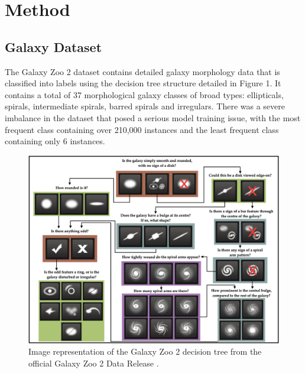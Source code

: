 \documentclass[10pt,twocolumn,letterpaper]{article}
\begin{document}
\section{Method}
\subsection{Galaxy Dataset}
The Galaxy Zoo 2 dataset contains detailed galaxy morphology data that is classified into labels using the decision tree structure detailed in Figure 1.
It contains a total of 37 morphological galaxy classes of broad types: ellipticals, spirals, intermediate spirals, barred spirals and irregulars.
There was a severe imbalance in the dataset that posed a serious model training issue, with the most frequent class containing over 210,000 instances and the least frequent class containing only 6 instances.
\begin{figure}[htbp]
    \includegraphics[width=\linewidth]{decision_tree.png}
    \caption{Image representation of the Galaxy Zoo 2 decision tree from the official Galaxy Zoo 2 Data Release \cite{Willett13}.}
    \label{fig:decisiontree}
  \end{figure}
\end{document}
